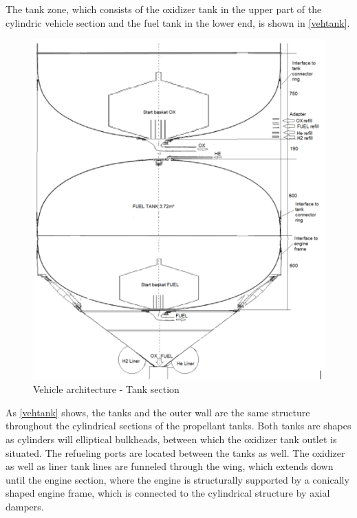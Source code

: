The tank zone, which consists of the oxidizer tank in the upper part of the cylindric vehicle section and the fuel tank in the lower end, is shown in \autoref{vehtank}.

\begin{figure}[H]
	\centering\includegraphics[width=0.8\linewidth]{vehtank}
	\caption{Vehicle architecture - Tank section}\label{vehtank}
\end{figure}

As \autoref{vehtank} shows, the tanks and the outer wall are the same structure throughout the cylindrical sections of the propellant tanks. Both tanks are shapes as cylinders will elliptical bulkheads, between which the oxidizer tank outlet is situated. The refueling ports are located between the tanks as well. The oxidizer as well as liner tank lines are funneled through the wing, which extends down until the engine section, where the engine is structurally supported by a conically shaped engine frame, which is connected to the cylindrical structure by axial dampers.